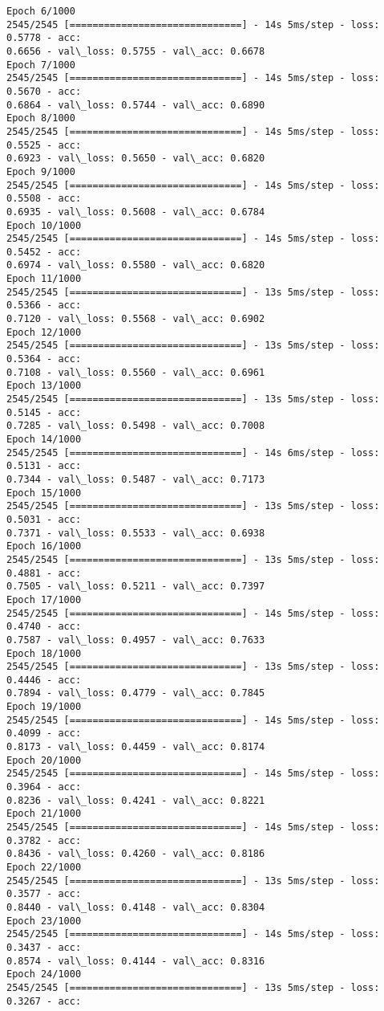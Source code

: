 \documentclass[11pt]{article}
\begin{document}
\begin{Verbatim}[commandchars=\\\{\}]
Epoch 6/1000
2545/2545 [==============================] - 14s 5ms/step - loss: 0.5778 - acc:
0.6656 - val\_loss: 0.5755 - val\_acc: 0.6678
Epoch 7/1000
2545/2545 [==============================] - 14s 5ms/step - loss: 0.5670 - acc:
0.6864 - val\_loss: 0.5744 - val\_acc: 0.6890
Epoch 8/1000
2545/2545 [==============================] - 14s 5ms/step - loss: 0.5525 - acc:
0.6923 - val\_loss: 0.5650 - val\_acc: 0.6820
Epoch 9/1000
2545/2545 [==============================] - 14s 5ms/step - loss: 0.5508 - acc:
0.6935 - val\_loss: 0.5608 - val\_acc: 0.6784
Epoch 10/1000
2545/2545 [==============================] - 14s 5ms/step - loss: 0.5452 - acc:
0.6974 - val\_loss: 0.5580 - val\_acc: 0.6820
Epoch 11/1000
2545/2545 [==============================] - 13s 5ms/step - loss: 0.5366 - acc:
0.7120 - val\_loss: 0.5568 - val\_acc: 0.6902
Epoch 12/1000
2545/2545 [==============================] - 13s 5ms/step - loss: 0.5364 - acc:
0.7108 - val\_loss: 0.5560 - val\_acc: 0.6961
Epoch 13/1000
2545/2545 [==============================] - 13s 5ms/step - loss: 0.5145 - acc:
0.7285 - val\_loss: 0.5498 - val\_acc: 0.7008
Epoch 14/1000
2545/2545 [==============================] - 14s 6ms/step - loss: 0.5131 - acc:
0.7344 - val\_loss: 0.5487 - val\_acc: 0.7173
Epoch 15/1000
2545/2545 [==============================] - 13s 5ms/step - loss: 0.5031 - acc:
0.7371 - val\_loss: 0.5533 - val\_acc: 0.6938
Epoch 16/1000
2545/2545 [==============================] - 13s 5ms/step - loss: 0.4881 - acc:
0.7505 - val\_loss: 0.5211 - val\_acc: 0.7397
Epoch 17/1000
2545/2545 [==============================] - 14s 5ms/step - loss: 0.4740 - acc:
0.7587 - val\_loss: 0.4957 - val\_acc: 0.7633
Epoch 18/1000
2545/2545 [==============================] - 13s 5ms/step - loss: 0.4446 - acc:
0.7894 - val\_loss: 0.4779 - val\_acc: 0.7845
Epoch 19/1000
2545/2545 [==============================] - 14s 5ms/step - loss: 0.4099 - acc:
0.8173 - val\_loss: 0.4459 - val\_acc: 0.8174
Epoch 20/1000
2545/2545 [==============================] - 14s 5ms/step - loss: 0.3964 - acc:
0.8236 - val\_loss: 0.4241 - val\_acc: 0.8221
Epoch 21/1000
2545/2545 [==============================] - 14s 5ms/step - loss: 0.3782 - acc:
0.8436 - val\_loss: 0.4260 - val\_acc: 0.8186
Epoch 22/1000
2545/2545 [==============================] - 13s 5ms/step - loss: 0.3577 - acc:
0.8440 - val\_loss: 0.4148 - val\_acc: 0.8304
Epoch 23/1000
2545/2545 [==============================] - 14s 5ms/step - loss: 0.3437 - acc:
0.8574 - val\_loss: 0.4144 - val\_acc: 0.8316
Epoch 24/1000
2545/2545 [==============================] - 13s 5ms/step - loss: 0.3267 - acc:

\end{Verbatim}
\end{document}
